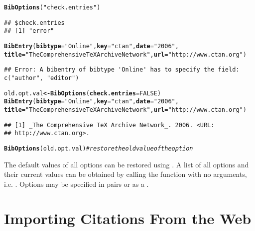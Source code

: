 \documentclass[article]{jss}\usepackage[]{graphicx}\usepackage[]{color}
\makeatletter
\newcommand{\hlnum}[1]{\textcolor[rgb]{0.125,0.125,1}{#1}}%
\newcommand{\hlstr}[1]{\textcolor[rgb]{0.125,0.125,1}{#1}}%
\newcommand{\hlcom}[1]{\textcolor[rgb]{1,0,0.753}{\textit{#1}}}%
\newcommand{\hlstd}[1]{\textcolor[rgb]{0.251,0.251,0.282}{#1}}%
\newcommand{\hlkwb}[1]{\textcolor[rgb]{0.439,0.251,1}{\textbf{#1}}}%
\newcommand{\hlkwc}[1]{\textcolor[rgb]{0.529,0,0.184}{\textbf{#1}}}%
\newcommand{\hlkwd}[1]{\textcolor[rgb]{0.251,0.251,0.282}{\textbf{#1}}}%
\newenvironment{kframe}{%
 \def\at@end@of@kframe{}%
 \ifinner\ifhmode%
  \def\at@end@of@kframe{\end{minipage}}%
  \begin{minipage}{\columnwidth}%
 \fi\fi%
 \def\FrameCommand##1{\hskip\@totalleftmargin \hskip-\fboxsep
 \colorbox{shadecolor}{##1}\hskip-\fboxsep
     \hskip-\linewidth \hskip-\@totalleftmargin \hskip\columnwidth}%
 \MakeFramed {\advance\hsize-\width
   \@totalleftmargin\z@ \linewidth\hsize
   \@setminipage}}%
 {\par\unskip\endMakeFramed%
 \at@end@of@kframe}
\newenvironment{knitrout}{}{} %
\makeatother
\begin{document}
\begin{knitrout}
\color{fgcolor}\begin{kframe}
\begin{alltt}
\hlkwd{BibOptions}\hlstd{(}\hlstr{"check.entries"}\hlstd{)}
\end{alltt}
\begin{verbatim}
## $check.entries
## [1] "error"
\end{verbatim}
\begin{alltt}
\hlkwd{BibEntry}\hlstd{(}\hlkwc{bibtype} \hlstd{=} \hlstr{"Online"}\hlstd{,} \hlkwc{key} \hlstd{=} \hlstr{"ctan"}\hlstd{,} \hlkwc{date} \hlstd{=} \hlstr{"2006"}\hlstd{,}
 \hlkwc{title} \hlstd{=} \hlstr{"The Comprehensive TeX Archive Network"}\hlstd{,} \hlkwc{url} \hlstd{=} \hlstr{"http://www.ctan.org"}\hlstd{)}
\end{alltt}
\begin{lstlisting}[style=error]
## Error: A bibentry of bibtype 'Online' has to specify the field: c("author", "editor")
\end{lstlisting}\begin{alltt}
\hlstd{old.opt.val} \hlkwb{<-} \hlkwd{BibOptions}\hlstd{(}\hlkwc{check.entries} \hlstd{=} \hlnum{FALSE}\hlstd{)}
\hlkwd{BibEntry}\hlstd{(}\hlkwc{bibtype} \hlstd{=} \hlstr{"Online"}\hlstd{,} \hlkwc{key} \hlstd{=} \hlstr{"ctan"}\hlstd{,} \hlkwc{date} \hlstd{=} \hlstr{"2006"}\hlstd{,}
 \hlkwc{title} \hlstd{=} \hlstr{"The Comprehensive TeX Archive Network"}\hlstd{,} \hlkwc{url} \hlstd{=} \hlstr{"http://www.ctan.org"}\hlstd{)}
\end{alltt}
\begin{verbatim}
## [1] _The Comprehensive TeX Archive Network_. 2006. <URL:
## http://www.ctan.org>.
\end{verbatim}
\begin{alltt}
\hlkwd{BibOptions}\hlstd{(old.opt.val)}  \hlcom{# restore the old value of the option}
\end{alltt}
\end{kframe}
\end{knitrout}

The default values of all options can be restored using .  A list of all options and their current values can be obtained by calling the function with no arguments, i.e. .  Options may be specified in  pairs or as a .
\section{Importing Citations From the Web}\label{sec_import}
\end{document}
